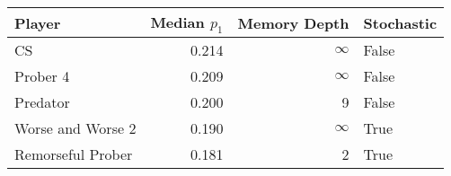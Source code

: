 \begin{tabular}{lrrl}
\toprule
            Player &  Median $p_1$ &  Memory Depth & Stochastic \\
\midrule
                CS &         0.214 &            \(\infty\) &      False \\
          Prober 4 &         0.209 &            \(\infty\) &      False \\
          Predator &         0.200 &             9 &      False \\
 Worse and Worse 2 &         0.190 &            \(\infty\) &       True \\
 Remorseful Prober &         0.181 &             2 &       True \\
\bottomrule
\end{tabular}
